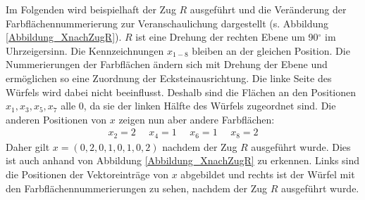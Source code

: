 \documentclass[12pt,a4paper, usenames, dvipsnames]{article}
\theoremstyle{mystyle}
\theoremstyle{definition}
\begin{document}
Im Folgenden wird beispielhaft der Zug $R$ ausgeführt und die Veränderung der Farbflächennummerierung zur Veranschaulichung dargestellt (s. Abbildung \ref{Abbildung_XnachZugR}). $R$ ist eine Drehung der rechten Ebene um 90$^\circ$ im Uhrzeigersinn. 
Die Kennzeichnungen $x_{1-8}$ bleiben an der gleichen Position. Die Nummerierungen  der Farbflächen ändern sich mit Drehung der Ebene und ermöglichen so eine Zuordnung der Ecksteinausrichtung. 
Die linke Seite des Würfels wird dabei nicht beeinflusst. Deshalb sind die Flächen an den Positionen $x_1, x_3, x_5, x_7$ alle 0, da sie der linken Hälfte des Würfels zugeordnet sind.
Die anderen Positionen von $x$ zeigen nun aber andere Farbflächen: 
\begin{align*}
x_2 = 2 \ \ \ \ \ \ x_4 = 1 \ \ \ \ \ \ x_6 = 1 \ \ \ \ \ \ x_8 = 2  
\end{align*}
Daher gilt $x = (0, 2, 0, 1, 0, 1, 0, 2)$ nachdem der Zug $R$ ausgeführt wurde. Dies ist auch anhand von Abbildung \ref{Abbildung_XnachZugR} zu erkennen. Links sind die Positionen der Vektoreinträge von $x$ abgebildet und rechts ist der Würfel mit den Farbflächennummerierungen zu sehen, nachdem der Zug $R$ ausgeführt wurde.
\end{document}
